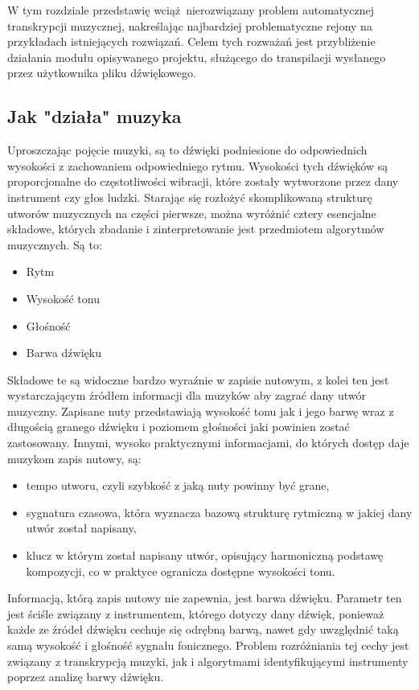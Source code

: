\documentclass[12pt,a4paper,twoside]{mwart}
\begin{document}
W tym rozdziale przedstawię wciąż nierozwiązany problem automatycznej transkrypcji muzycznej, nakreślając najbardziej problematyczne rejony na przykładach istniejących rozwiązań.  Celem tych rozważań jest przybliżenie działania modułu opisywanego projektu, służącego do transpilacji wysłanego przez użytkownika pliku dźwiękowego.

\subsection{Jak "działa" muzyka}
Uproszczając pojęcie muzyki, są to dźwięki podniesione do odpowiednich wysokości z zachowaniem odpowiedniego rytmu. Wysokości tych dźwięków są proporcjonalne do częstotliwości wibracji, które zostały wytworzone przez dany instrument czy głos ludzki. Starając się rozłożyć skomplikowaną strukturę utworów muzycznych na części pierwsze, można wyróżnić cztery esencjalne składowe, których zbadanie i zinterpretowanie jest przedmiotem algorytmów muzycznych. Są to:
\begin{itemize}
\item Rytm
\item Wysokość tonu
\item Głośność
\item Barwa dźwięku
\end{itemize}
Składowe te są widoczne bardzo wyraźnie w zapisie nutowym, z kolei ten jest wystarczającym źródłem informacji dla muzyków aby zagrać dany utwór muzyczny. Zapisane nuty przedstawiają wysokość tonu jak i jego barwę wraz z długością granego dźwięku i poziomem głośności jaki powinien zostać zastosowany. Innymi, wysoko praktycznymi informacjami, do których dostęp daje muzykom zapis nutowy, są: 
\begin{itemize}
  \item tempo utworu, czyli szybkość z jaką nuty powinny być grane, 
  \item sygnatura czasowa, która wyznacza bazową strukturę rytmiczną w jakiej dany utwór został napisany,
  \item klucz w którym został napisany utwór, opisujący harmoniczną podstawę kompozycji, co w praktyce ogranicza dostępne wysokości tonu.
\end{itemize} 
Informacją, którą zapis nutowy nie zapewnia, jest barwa dźwięku. Parametr ten jest ściśle związany z instrumentem, którego dotyczy dany dźwięk, ponieważ każde ze źródeł dźwięku cechuje się odrębną barwą, nawet gdy uwzględnić taką samą wysokość i głośność sygnału fonicznego. Problem rozróżniania tej cechy jest związany z transkrypcją muzyki, jak i algorytmami identyfikującymi instrumenty poprzez analizę barwy dźwięku.
\end{document}
